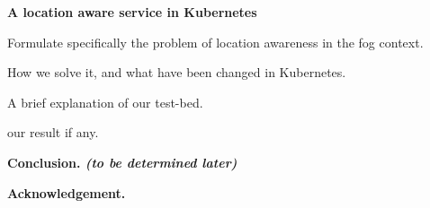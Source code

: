 \documentclass{report}
\begin{document}
\begin{outline}
\begin{outline}
	\end{outline}
	
	\item {\bf  A location aware service in Kubernetes}
	\begin{outline}
		\item Formulate specifically the problem of location awareness in the fog context.
		\item How we solve it, and what have been changed in Kubernetes. 
		\item A brief explanation of our test-bed.
		\item our result if any. 
				
	\end{outline}

	\item {\bf Conclusion. {\em (to be determined later)}}
	\item {\bf Acknowledgement.}



	

\end{outline}
\end{document}
